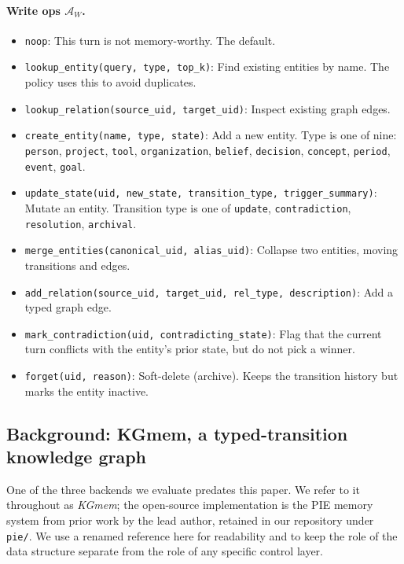 \documentclass[11pt]{article}
\begin{document}
\paragraph{Write ops $\mathcal{A}_W$.}
\begin{itemize}
  \item \texttt{noop}: This turn is not memory-worthy. The default.
  \item \texttt{lookup\_entity(query, type, top\_k)}: Find existing
    entities by name. The policy uses this to avoid duplicates.
  \item \texttt{lookup\_relation(source\_uid, target\_uid)}: Inspect
    existing graph edges.
  \item \texttt{create\_entity(name, type, state)}: Add a new entity.
    Type is one of nine: \texttt{person}, \texttt{project}, \texttt{tool},
    \texttt{organization}, \texttt{belief}, \texttt{decision},
    \texttt{concept}, \texttt{period}, \texttt{event}, \texttt{goal}.
  \item \texttt{update\_state(uid, new\_state, transition\_type,
    trigger\_summary)}: Mutate an entity. Transition type is one of
    \texttt{update}, \texttt{contradiction}, \texttt{resolution},
    \texttt{archival}.
  \item \texttt{merge\_entities(canonical\_uid, alias\_uid)}: Collapse
    two entities, moving transitions and edges.
  \item \texttt{add\_relation(source\_uid, target\_uid, rel\_type,
    description)}: Add a typed graph edge.
  \item \texttt{mark\_contradiction(uid, contradicting\_state)}: Flag
    that the current turn conflicts with the entity's prior state, but
    do not pick a winner.
  \item \texttt{forget(uid, reason)}: Soft-delete (archive). Keeps the
    transition history but marks the entity inactive.
\end{itemize}

\subsection{Background: KGmem, a typed-transition knowledge graph}
\label{sec:pie}

One of the three backends we evaluate predates this paper. We refer to
it throughout as \emph{KGmem}; the open-source implementation is the
PIE memory system from prior work by the lead author, retained in our
repository under \texttt{pie/}. We use a renamed reference here for
readability and to keep the role of the data structure separate from
the role of any specific control layer.
\end{document}
